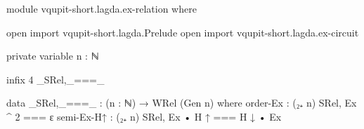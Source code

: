 ﻿\begin{code}[hide]
module vqupit-short.lagda.ex-relation where

open import vqupit-short.lagda.Prelude
open import vqupit-short.lagda.ex-circuit

private variable
  n : ℕ

infix 4 _SRel,_===_
\end{code}
\begin{code}
data _SRel,_===_ : (n : ℕ) → WRel (Gen n) where
  order-Ex    : (₂₊ n) SRel,  Ex ^ 2 === ε
  semi-Ex-H↑  : (₂₊ n) SRel,  Ex • H ↑ === H ↓ • Ex
\end{code}
